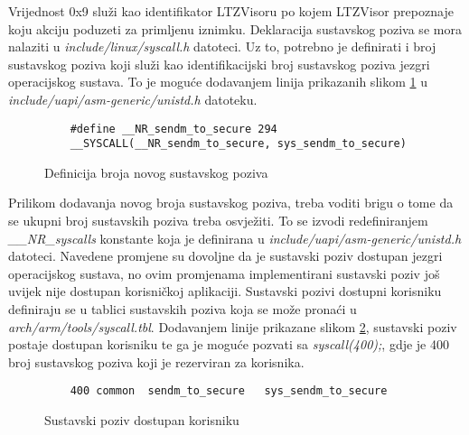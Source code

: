 \documentclass[times, utf8, diplomski, numeric]{fer}
\begin{document}
Vrijednost 0x9 služi kao identifikator LTZVisoru po kojem LTZVisor prepoznaje koju akciju poduzeti za primljenu iznimku.
Deklaracija sustavskog poziva se mora nalaziti u \textit{include/linux/syscall.h} datoteci. Uz to, potrebno je definirati
i broj sustavskog poziva koji služi kao identifikacijski broj sustavskog poziva jezgri operacijskog sustava. To je moguće
dodavanjem linija prikazanih slikom \ref{sc_num} u \textit{include/uapi/asm-generic/unistd.h} datoteku.

\begin{figure}[H]
  \begin{lstlisting}
    #define __NR_sendm_to_secure 294
    __SYSCALL(__NR_sendm_to_secure, sys_sendm_to_secure)
  \end{lstlisting}
  \caption{Definicija broja novog sustavskog poziva}
  \label{sc_num}
\end{figure}

Prilikom dodavanja novog broja sustavskog poziva, treba voditi brigu o tome da se ukupni broj sustavskih poziva treba
osvježiti. To se izvodi redefiniranjem \textit{\_\_NR\_syscalls} konstante koja je definirana u
\textit{include/uapi/asm-generic/unistd.h} datoteci. Navedene promjene su dovoljne da je sustavski poziv dostupan jezgri
operacijskog sustava, no ovim promjenama implementirani sustavski poziv još uvijek nije dostupan korisničkoj aplikaciji.
Sustavski pozivi dostupni korisniku definiraju se u tablici sustavskih poziva koja se može pronaći u
\textit{arch/arm/tools/syscall.tbl}. Dodavanjem linije prikazane slikom \ref{user_sc}, sustavski poziv postaje dostupan
korisniku te ga je moguće pozvati sa \textit{syscall(400);}, gdje je 400 broj sustavskog poziva koji je rezerviran za
korisnika.

\begin{figure}[H]
  \begin{lstlisting}
    400 common  sendm_to_secure   sys_sendm_to_secure
  \end{lstlisting}
  \caption{Sustavski poziv dostupan korisniku}
  \label{user_sc}
\end{figure}
\end{document}
